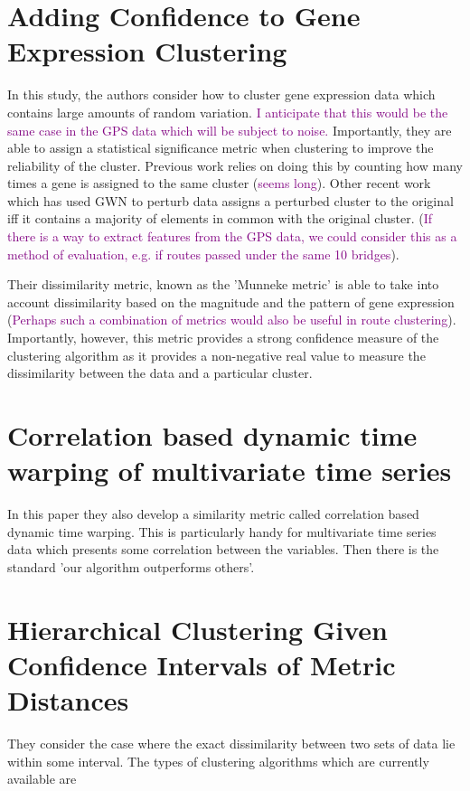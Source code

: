 \documentclass{report}
\newcommand\NOTE[1]{\textcolor{purple}{#1}}
\begin{document}
    \section{Adding Confidence to Gene Expression Clustering}

    In this study, the authors consider how to cluster gene expression data which contains large amounts of random variation. \NOTE{I anticipate that this would be the same case in the GPS data which will be subject to noise.} Importantly, they are able to assign a statistical significance metric when clustering to improve the reliability of the cluster. Previous work relies on doing this by counting how many times a gene is assigned to the same cluster (\NOTE{seems long}). Other recent work which has used GWN to perturb data assigns a perturbed cluster to the original iff it contains a majority of elements in common with the original cluster. (\NOTE{If there is a way to extract features from the GPS data, we could consider this as a method of evaluation, e.g. if routes passed under the same 10 bridges}). 

    Their dissimilarity metric, known as the 'Munneke metric' is able to take into account dissimilarity based on the magnitude and the pattern of gene expression (\NOTE{Perhaps such a combination of metrics would also be useful in route clustering}). Importantly, however, this metric provides a strong confidence measure of the clustering algorithm as it provides a non-negative real value to measure the dissimilarity between the data and a particular cluster.


    \section{Correlation based dynamic time warping of multivariate time series}

    In this paper they also develop a similarity metric called correlation based dynamic time warping. This is particularly handy for multivariate time series data which presents some correlation between the variables. Then there is the standard 'our algorithm outperforms others'.


    \section{Hierarchical Clustering Given Confidence Intervals of Metric Distances}

    They consider the case where the exact dissimilarity between two sets of data lie within some interval. The types of clustering algorithms which are currently available are
\end{document}
